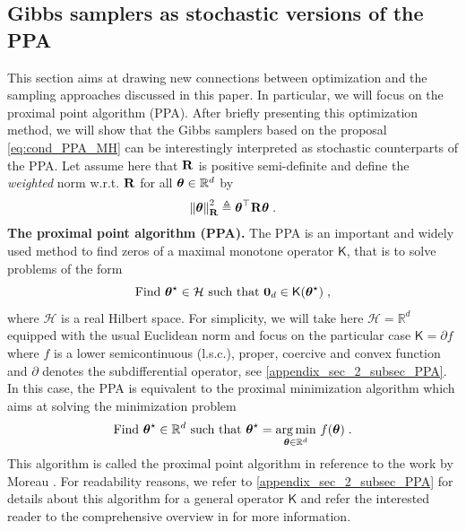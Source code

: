 \documentclass[nohypdvips,onefignum,onetabnum]{siamart171218}
\begin{document}
\subsection{Gibbs samplers as stochastic versions of the PPA}
\label{subsec:PPA}
This section aims at drawing new connections between optimization and the sampling approaches discussed in this paper. In particular, we will focus on the proximal point algorithm (PPA)\cite{Rockafellar1976}. After briefly presenting this optimization method, we will show that the Gibbs samplers based on the proposal \cref{eq:cond_PPA_MH} can be interestingly interpreted as stochastic counterparts of the PPA. 
Let assume here that $\mathbf{R}$ is positive semi-definite and define the \textit{weighted} norm w.r.t. $\mathbf{R}$ for all $\boldsymbol{\theta} \in \mathbb{R}^d$ by
\begin{equation}
  \left\|\boldsymbol{\theta}\right\|_{\mathbf{R}}^2 \triangleq {\boldsymbol{\theta}^{\top}\mathbf{R}\boldsymbol{\theta}}\;.
\end{equation} 
%
\noindent\textbf{The proximal point algorithm (PPA).} 
The PPA \cite{Rockafellar1976} is an important and widely used method to find zeros of a maximal monotone operator $\mathsf{K}$, that is to solve problems of the form 
\begin{equation}
  \text{Find $\Bs{\theta}^{\star} \in \mathcal{H}$ such that } \B{0}_d \in \mathsf{K}(\Bs{\theta}^{\star})\eqsp, \label{eq:zeros_operators}
\end{equation}
%
where $\mathcal{H}$ is a real Hilbert space. For simplicity, we will take here $\mathcal{H} = \mathbb{R}^d$ equipped with the usual Euclidean norm and focus on the particular case $\mathsf{K} = \partial f$ where $f$ is a lower semicontinuous (l.s.c.), proper, coercive and convex function and $\partial$ denotes the subdifferential operator, see \cref{appendix_sec_2_subsec_PPA}.
In this case, the PPA is equivalent to the proximal minimization algorithm  \cite{Martinet1970,Martinet1972} which aims at solving the minimization problem 
\begin{equation}
  \text{Find $\Bs{\theta}^{\star} \in \mathbb{R}^d$ such that } \Bs{\theta}^{\star} = \underset{\Bs{\theta}\in\mathbb{R}^d}{\arg \min} \ f(\Bs{\theta})\eqsp. \label{eq:optimization_problem}
\end{equation}
This algorithm is called the proximal point algorithm in reference to the work by Moreau \cite{Moreau1965}.
For readability reasons, we refer to \cref{appendix_sec_2_subsec_PPA} for details about this algorithm for a general operator $\mathsf{K}$ and refer the interested reader to the comprehensive overview in \cite{Rockafellar1976} for more information.
\end{document}
